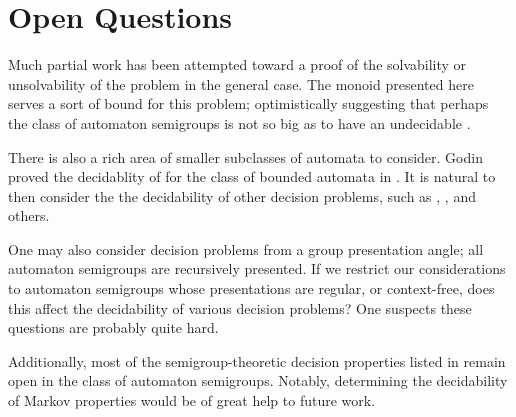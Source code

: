 \documentclass[11pt, titlepage]{article}
\begin{document}

\section{Open Questions}

Much partial work has been attempted toward a proof of the solvability
or unsolvability of the  problem in the general
case. The monoid presented here serves a sort of bound for this
problem; optimistically suggesting that perhaps the class of automaton
semigroups is not so big as to have an undecidable .

There is also a rich area of smaller subclasses of automata to
consider. Godin proved the decidablity of  for the
class of bounded automata in \cite{Godin:knapsack}. It is natural to
then consider the the decidability of other decision problems, such as
, , and others.

One may also consider decision problems from a group presentation
angle; all automaton semigroups are recursively presented. If we
restrict our considerations to automaton semigroups whose
presentations are regular, or context-free, does this affect the
decidability of various decision problems? One suspects these
questions are probably quite hard.

Additionally, most of the semigroup-theoretic decision properties
listed in \cite{Cain09:dec_prob} remain open in the class of automaton
semigroups. Notably, determining the decidability of Markov properties
would be of great help to future work.


\nocite{*}

\end{document}
